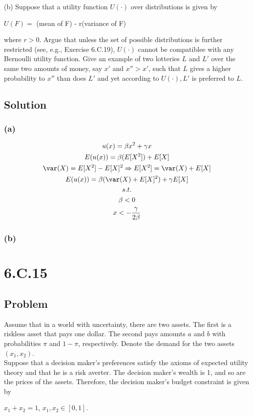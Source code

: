\documentclass[10pt, a4paper]{article}
\begin{document}
      (b) Suppose that a utility function $U(\cdot)$ over distributions is given by 
      \begin{center}
        $U(F) = $ (mean of F) - r(variance of F)
      \end{center}
      where $r>0$. Argue that unless the set of possible distributions is further restricted (see, e.g., Exercise 6.C.19), $U(\cdot)$ cannot be compatiblee with any Bernoulli utility function. Give an example of two lotteries $L$ and $L'$ over the same two amounts of money, say $x'$ and $x''>x'$, such that $L$ gives a higher probability to $x''$ than does $L'$ and yet according to $U(\cdot), L'$ is preferred to $L$. 
    \subsection*{Solution}
      \subsubsection*{(a)}
        \begin{gather*}
          u(x) = \beta x^2 + \gamma x\\
          E(u(x)) = \beta(E[X^2]) + E[X]\\
          \var(X) = E[X^2] - E[X]^2 \Rightarrow E[X^2] = \var(X) + E[X]\\
          E(u(x)) = \beta(\var(X)+E[X]^2) + \gamma E[X] \\
          s.t. \\
          \beta<0\\
          x < -\frac{\gamma}{2\beta} 
        \end{gather*}
      \subsubsection{(b)}
      
  \section*{6.C.15}
    \subsection*{Problem}
      Assume that in a world with uncertainty, there are two assets. The first is a riskless asset that pays one dollar. The second pays amounts $a$ and $b$ with probabilities $\pi$ and $1-\pi$, respectively. Denote the demand for the two assets $(x_1,x_2)$. \\
      Suppose that a decision maker's preferences satisfy the axioms of expected utility theory and that he is a risk averter. The decision maker's wealth is 1, and so are the prices of the assets. Therefore, the decision maker's budget constraint is given by 
      \begin{center}
        $x_1+x_2=1$, $x_1,x_2\in[0,1]$.
      \end{center}
\end{document}
